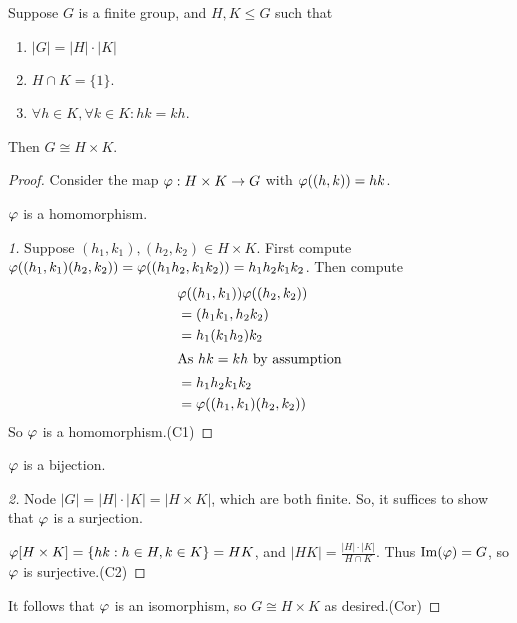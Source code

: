 \documentclass[notes.tex]{subfiles}
\begin{document}
\begin{corollary}
	\label{congtodp}
	Suppose $G$ is a finite group, and $H, K\le G$ such that 
	\begin{enumerate}
		\item $|G| = |H|\cdot |K|$
		\item $H\cap K = \{1\}$.
		\item $\forall h\in K, \forall k\in K: hk = kh$.
	\end{enumerate}
	Then $G\cong H\times K$.
\end{corollary}
\begin{proof}
	Consider the map $\varphi:H\times K\to G$ with $\varphi((h, k)) = hk$.

	\begin{claim}[1]
		$\varphi$ is a homomorphism.
	\end{claim}
	\begin{proof}[1]
		Suppose $(h_1, k_1), (h_2, k_2) \in H\times K$.
		First compute $\varphi((h_1, k_1)(h_2, k_2)) = \varphi((h_1h_2, k_1k_2)) = h_1h_2k_1k_2$.
		Then compute
		\begin{align*}
		 	&\varphi((h_1, k_1))\varphi((h_2, k_2))\\
		 	&= (h_1k_1, h_2k_2) \\
		 	&= h_1(k_1h_2)k_2 \\
		 	\shortintertext{As $hk = kh$ by assumption}
		 	&= h_1h_2k_1k_2\\
		 	&=\varphi((h_1, k_1)(h_2, k_2))
		 \end{align*}
		 So $\varphi$ is a homomorphism.\qedhere(C1)
	\end{proof}
	\begin{claim}[2]
		$\varphi$ is a bijection. 
	\end{claim}
	\begin{proof}[2]
		Node $|G| = |H|\cdot|K| = |H\times K|$, which are both finite. So, it suffices to show that $\varphi$ is a surjection.

		$\varphi[H\times K] = \{hk:h\in H, k\in K\} = HK$, and $|HK|=\frac{|H|\cdot|K|}{H\cap K}$. Thus $\operatorname{\mathrm{Im}}(\varphi) = G$, so $\varphi$ is surjective.\qedhere(C2)
	\end{proof}
	It follows that $\varphi$ is an isomorphism, so $G\cong H\times K$ as desired.\qedhere(Cor)
\end{proof}
\end{document}
